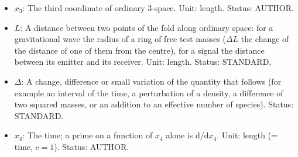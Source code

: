 \documentclass[
  10pt,
]{article}
\begin{document}
\begin{itemize}
  \(\mathrm{e}\): Euler's number, the base of the natural logarithm;
  \(\mathrm{e}^{X}\) is the exponential of \(X\). Unit: dimensionless.
  Value: 2.718281828. Status: STANDARD.
\item
  \(x_3\): The third coordinate of ordinary 3-space. Unit: length.
  Status: AUTHOR.
\item
  \(L\): A distance between two points of the fold along ordinary space:
  for a gravitational wave the radius of a ring of free test masses
  (\(\Delta L\) the change of the distance of one of them from the
  centre), for a signal the distance between its emitter and its
  receiver. Unit: length. Status: STANDARD.
\item
  \(\Delta\): A change, difference or small variation of the quantity
  that follows (for example an interval of the time, a perturbation of a
  density, a difference of two squared masses, or an addition to an
  effective number of species). Status: STANDARD.
\item
  \(x_4\): The time; a prime on a function of \(x_4\) alone is
  \(\mathrm{d}/\mathrm{d}x_4\). Unit: length (= time, \(c = 1\)).
  Status: AUTHOR.
\end{itemize}
\end{document}

